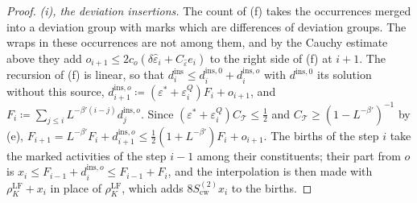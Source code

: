 \documentclass[11pt]{preprint}
\numberwithin{equation}{section}
\theoremstyle{definition}
\theoremstyle{remark}
\theoremstyle{plain}
\begin{document}
\begin{proof}
\emph{(i), the deviation insertions.} The count of (f) takes the occurrences merged into a deviation group with marks which are differences of deviation groups. The wraps in these occurrences are not among them, and by the Cauchy estimate above they add $o_{i+1} \leq 2c_o(\delta\hat\varepsilon_i + C_{\hat\varepsilon}e_i)$ to the right side of (f) at $i + 1$. The recursion of (f) is linear, so that $d^{\mathrm{ins}}_i \leq d^{\mathrm{ins},0}_i + d^{\mathrm{ins},o}_i$ with $d^{\mathrm{ins},0}$ its solution without this source, $d^{\mathrm{ins},o}_{i+1} \coloneqq (\varepsilon^* + \varepsilon^Q_i)F_i + o_{i+1}$, and $F_i \coloneqq \sum_{j \leq i}L^{-\beta'(i-j)}d^{\mathrm{ins},o}_j$. Since $(\varepsilon^* + \varepsilon^Q_i)C_{\mathcal T} \leq \frac12$ and $C_{\mathcal T} \geq (1 - L^{-\beta'})^{-1}$ by (e), $F_{i+1} = L^{-\beta'}F_i + d^{\mathrm{ins},o}_{i+1} \leq \frac12(1 + L^{-\beta'})F_i + o_{i+1}$. The births of the step $i$ take the marked activities of the step $i - 1$ among their constituents; their part from $o$ is $x_i \leq F_{i-1} + d^{\mathrm{ins},o}_i \leq F_{i-1} + F_i$, and the interpolation is then made with $\rho^{\mathrm{LF}}_K + x_i$ in place of $\rho^{\mathrm{LF}}_K$, which adds $8S^{(2)}_{\mathrm{cw}}x_i$ to the births.


\end{proof}
\end{document}
